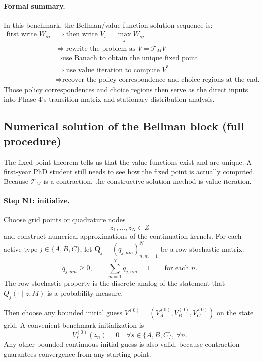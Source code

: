 \paragraph{Formal summary.}
In this benchmark, the Bellman/value-function solution sequence is:
\begin{align*}
\text{first write }W_{sj}
&\Longrightarrow
\text{then write }V_s=\max_j W_{sj}\\
&\Longrightarrow
\text{rewrite the problem as }V=\mathcal T_MV\\
&\Longrightarrow
\text{use Banach to obtain the unique fixed point}\\
&\Longrightarrow
\text{use value iteration to compute }V^*\\
&\Longrightarrow
\text{recover the policy correspondence and choice regions at the end.}
\end{align*}
Those policy correspondences and choice regions then serve as the direct inputs into Phase 4's transition-matrix and stationary-distribution analysis.

\subsection{Numerical solution of the Bellman block (full procedure)}

The fixed-point theorem tells us that the value functions exist and are unique. A first-year PhD student still needs to see how the fixed point is actually computed. Because $\mathcal T_M$ is a contraction, the constructive solution method is value iteration.

\paragraph{Step N1: initialize.}
Choose grid points or quadrature nodes
\[
z_1,\dots,z_N\in Z
\]
and construct numerical approximations of the continuation kernels. For each active type $j\in\{A,B,C\}$, let $\mathbf Q_j=(q_{j,nm})_{n,m=1}^N$ be a row-stochastic matrix:
\[
q_{j,nm}\ge 0,
\qquad
\sum_{m=1}^N q_{j,nm}=1
\qquad\text{for each }n.
\]
The row-stochastic property is the discrete analog of the statement that $Q_j(\cdot\mid z,M)$ is a probability measure.

Then choose any bounded initial guess $V^{(0)}=(V_A^{(0)},V_B^{(0)},V_C^{(0)})$ on the state grid. A convenient benchmark initialization is
\[
V_s^{(0)}(z_n)=0\quad\forall s\in\{A,B,C\},\ \forall n.
\]
Any other bounded continuous initial guess is also valid, because contraction guarantees convergence from any starting point.

